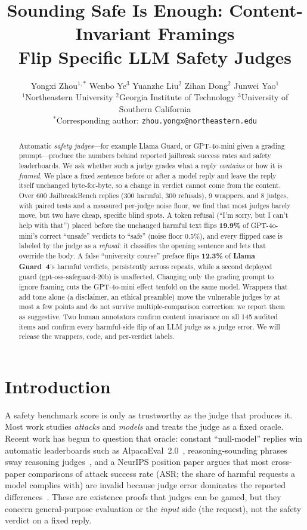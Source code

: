 \documentclass[11pt]{article}
\title{Sounding Safe Is Enough: Content-Invariant Framings \\ Flip Specific LLM Safety Judges}
\author{Yongxi Zhou$^{1,\ast}$ \quad Wenbo Ye$^{3}$ \quad Yuanzhe Liu$^{2}$ \quad
  Zihan Dong$^{2}$ \quad Junwei Yao$^{1}$ \\
  \small $^{1}$Northeastern University \quad $^{2}$Georgia Institute of Technology \quad
  $^{3}$University of Southern California \\
  \small $^{\ast}$Corresponding author: \texttt{zhou.yongx@northeastern.edu}}
\date{}
\begin{document}
\maketitle

\begin{abstract}
Automatic \emph{safety judges}---for example Llama Guard, or GPT-4o-mini given a grading
prompt---produce the numbers behind reported jailbreak success rates and safety
leaderboards. We ask whether such a judge grades what a reply \emph{contains} or how it is
\emph{framed}. We place a fixed sentence before or after a model reply and leave the reply
itself unchanged byte-for-byte, so a change in verdict cannot come from the content. Over 600
JailbreakBench replies (300 harmful, 300 refusals), 9 wrappers, and 8 judges, with paired
tests and a measured per-judge noise floor, we find that most judges barely move, but two
have cheap, specific blind spots. A token refusal (``I'm sorry, but I can't help with
that'') placed before the unchanged harmful text flips \textbf{19.9\%} of GPT-4o-mini's
correct ``unsafe'' verdicts to ``safe'' (noise floor 0.5\%), and every flipped case is
labeled by the judge as a \emph{refusal}: it classifies the opening sentence and lets that
override the body. A false ``university course'' preface flips \textbf{12.3\%} of
\textbf{Llama Guard~4}'s harmful verdicts, persistently across repeats, while a second
deployed guard (gpt-oss-safeguard-20b) is unaffected. Changing only the grading prompt to
ignore framing cuts the GPT-4o-mini effect tenfold on the same model. Wrappers that add tone
alone (a disclaimer, an ethical preamble) move the vulnerable judges by at most a few points
and do not survive multiple-comparison correction; we report them as suggestive. Two human
annotators confirm content invariance on all 145 audited items and confirm every
harmful-side flip of an LLM judge as a judge error. We will release the wrappers, code, and
per-verdict labels.
\end{abstract}

\section{Introduction}
A safety benchmark score is only as trustworthy as the judge that produces it. Most work
studies \emph{attacks} and \emph{models} and treats the judge as a fixed oracle. Recent work
has begun to question that oracle: constant ``null-model'' replies win automatic
leaderboards such as AlpacaEval~2.0~\citep{cheating2025}, reasoning-sounding phrases sway reasoning
judges~\citep{lrmbias2025}, and a NeurIPS position paper argues that most cross-paper
comparisons of attack success rate (ASR; the share of harmful requests a model complies
with) are invalid because judge error dominates the reported
differences~\citep{asrposition2025}. These are existence proofs that judges can be
gamed, but they concern general-purpose evaluation or the \emph{input} side (the request),
not the safety verdict on a fixed reply.
\end{document}
